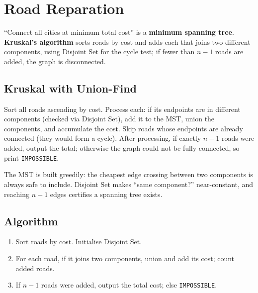 \section{Road Reparation}
\label{sec:cses-road-reparation}


\begin{patternbox}
``Connect all cities at minimum total cost'' is a \textbf{minimum spanning
tree}. \textbf{Kruskal's algorithm} sorts roads by cost and adds each that
joins two different components, using Disjoint Set for the cycle test; if
fewer than $n-1$ roads are added, the graph is disconnected.
\end{patternbox}

\subsection*{Kruskal with Union-Find}

Sort all roads ascending by cost. Process each: if its endpoints are in
different components (checked via Disjoint Set), add it to the MST, union
the components, and accumulate the cost. Skip roads whose endpoints are
already connected (they would form a cycle). After processing, if exactly
$n-1$ roads were added, output the total; otherwise the graph could not be
fully connected, so print \texttt{IMPOSSIBLE}.

\begin{ideabox}
The MST is built greedily: the cheapest edge crossing between two
components is always safe to include. Disjoint Set makes ``same component?''
near-constant, and reaching $n-1$ edges certifies a spanning tree exists.
\end{ideabox}

\subsection*{Algorithm}

\begin{enumerate}
  \item Sort roads by cost. Initialise Disjoint Set.
  \item For each road, if it joins two components, union and add its cost;
        count added roads.
  \item If $n-1$ roads were added, output the total cost; else
        \texttt{IMPOSSIBLE}.
\end{enumerate}

